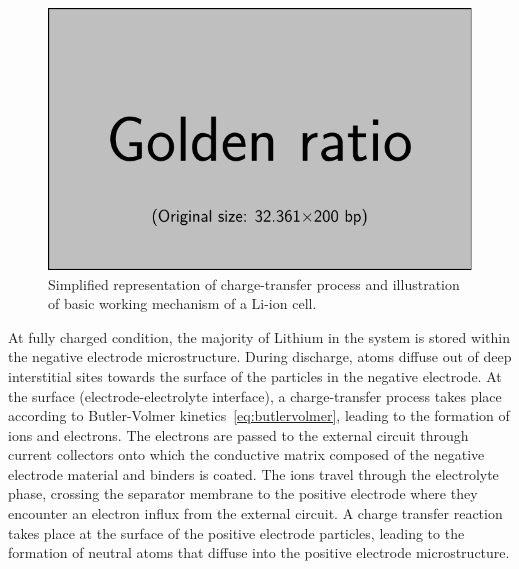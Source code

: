 \begin{figure}[h]
    \centering
    \includegraphics{placeholder_images/example-image-golden.pdf}
    \caption[Charge-transer and basic working mechanism of a Li-ion cell]{Simplified representation of charge-transfer
    process and illustration of basic working mechanism of a Li-ion cell.}
    \label{fig:chargetransferprocess}
\end{figure}

At fully  charged condition,  the majority  of Lithium in  the system  is stored
within  the  negative  electrode  microstructure.  During  discharge,  
atoms  diffuse  out of  deep  interstitial  sites  towards  the surface  of  the
particles  in  the negative  electrode.  At  the surface  (electrode-electrolyte
interface),  a charge-transfer  process takes  place according  to Butler-Volmer
kinetics~\cref{eq:butlervolmer}, leading to the  formation of  ions and
electrons.  The electrons  are passed  to the  external circuit  through 
current collectors  onto which  the conductive matrix  composed of  the negative
electrode material and binders is coated.  The  ions travel through the
electrolyte phase,  crossing the  separator membrane  to the  positive electrode
where they  encounter an  electron influx  from the  external circuit.  A charge
transfer  reaction  takes  place  at  the  surface  of  the  positive  electrode
particles, leading to the formation of neutral  atoms that diffuse into
the positive electrode microstructure.

